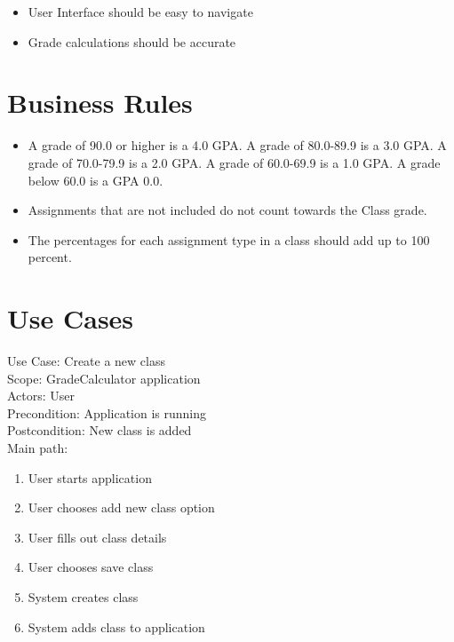 \documentclass[12pt]{article}
\begin{document}
\begin{itemize}
	\item User Interface should be easy to navigate
	\item Grade calculations should be accurate
\end{itemize}

\newpage

\section*{Business Rules}

\begin{itemize}
	\item A grade of 90.0 or higher is a 4.0 GPA. A grade of 80.0-89.9 is a 3.0 GPA. A grade of 70.0-79.9 is a 2.0 GPA. A grade of 60.0-69.9 is a 1.0 GPA. A grade below 60.0 is a GPA 0.0.
	\item Assignments that are not included do not count towards the Class grade.
	\item The percentages for each assignment type in a class should add up to 100 percent.
\end{itemize}

\newpage

\section*{Use Cases}

\noindent
Use Case: Create a new class \\

\noindent
Scope: GradeCalculator application \\

\noindent
Actors: User \\

\noindent
Precondition: Application is running \\

\noindent
Postcondition: New class is added \\

\noindent
Main path:

\begin{enumerate}
	\item User starts application
	\item User chooses add new class option
	\item User fills out class details
	\item User chooses save class
	\item System creates class
	\item System adds class to application
\end{enumerate}
\end{document}
